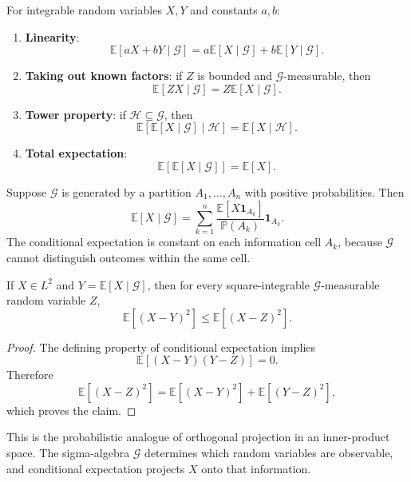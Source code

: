 \begin{theorem}
For integrable random variables $X,Y$ and constants $a,b$:
\begin{enumerate}
    \item \textbf{Linearity}:
    \[
        \mathbb{E}[aX+bY\mid\mathcal{G}]
        =a\mathbb{E}[X\mid\mathcal{G}]
        +b\mathbb{E}[Y\mid\mathcal{G}].
    \]
    \item \textbf{Taking out known factors}: if $Z$ is bounded and $\mathcal{G}$-measurable, then
    \[
        \mathbb{E}[ZX\mid\mathcal{G}]
        =Z\mathbb{E}[X\mid\mathcal{G}].
    \]
    \item \textbf{Tower property}: if $\mathcal{H}\subseteq\mathcal{G}$, then
    \[
        \mathbb{E}[\mathbb{E}[X\mid\mathcal{G}]\mid\mathcal{H}]
        =\mathbb{E}[X\mid\mathcal{H}].
    \]
    \item \textbf{Total expectation}:
    \[
        \mathbb{E}[\mathbb{E}[X\mid\mathcal{G}]]=\mathbb{E}[X].
    \]
\end{enumerate}
\end{theorem}

\begin{example}
Suppose $\mathcal{G}$ is generated by a partition $A_1,\dots,A_n$ with positive probabilities. Then
\[
    \mathbb{E}[X\mid\mathcal{G}]
    =\sum_{k=1}^n
    \frac{\mathbb{E}[X\mathbf{1}_{A_k}]}{\mathbb{P}(A_k)}
    \mathbf{1}_{A_k}.
\]
The conditional expectation is constant on each information cell $A_k$, because $\mathcal{G}$ cannot distinguish outcomes within the same cell.
\end{example}

\begin{theorem}
If $X\in L^2$ and $Y=\mathbb{E}[X\mid\mathcal{G}]$, then for every square-integrable $\mathcal{G}$-measurable random variable $Z$,
\[
    \mathbb{E}[(X-Y)^2]
    \leq
    \mathbb{E}[(X-Z)^2].
\]
\end{theorem}

\begin{proof}
The defining property of conditional expectation implies
\[
    \mathbb{E}[(X-Y)(Y-Z)]=0.
\]
Therefore
\[
    \mathbb{E}[(X-Z)^2]
    =\mathbb{E}[(X-Y)^2]
     +\mathbb{E}[(Y-Z)^2],
\]
which proves the claim.
\end{proof}

\begin{remark}
This is the probabilistic analogue of orthogonal projection in an inner-product space. The sigma-algebra $\mathcal{G}$ determines which random variables are observable, and conditional expectation projects $X$ onto that information.
\end{remark}

